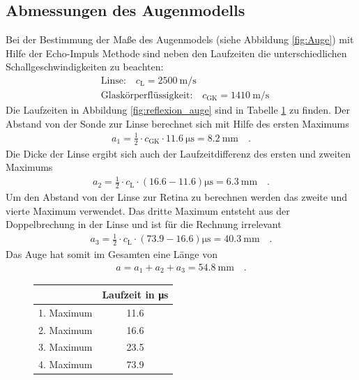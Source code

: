   \subsection{Abmessungen des Augenmodells}
Bei der Bestimmung der Maße des Augenmodels (siehe Abbildung \ref{fig:Auge}) mit Hilfe der Echo-Impuls Methode sind neben den Laufzeiten die unterschiedlichen Schallgeschwindigkeiten zu beachten:
\begin{align}
	& \text{Linse:} \quad c_\text{L} = \SI{2500}{\meter\per\second} \\
	& \text{Glaskörperflüssigkeit:} \quad c_\text{GK} = \SI{1410}{\meter\per\second} 
\end{align}
Die Laufzeiten in Abbildung \ref{fig:reflexion_auge} sind in Tabelle \ref{tab:laufzeiten_auge} zu finden.
Der Abstand von der Sonde zur Linse berechnet sich mit Hilfe des ersten Maximums
\begin{align}
	a_1 = \frac{1}{2}\cdot  c_\text{GK} \cdot \SI{11.6}{\micro\second} =
	\SI{8.2}{\milli\meter}  \quad .
\end{align}
Die Dicke der Linse ergibt sich auch der Laufzeitdifferenz des ersten und zweiten Maximums
\begin{align}
	a_2 = \frac{1}{2}\cdot  c_\text{L} \cdot (16.6-11.6)\si{\micro\second} =
	\SI{6.3}{\milli\meter}  \quad .
\end{align}
Um den Abstand von der Linse zur Retina zu berechnen werden das zweite und vierte Maximum verwendet. Das dritte Maximum entsteht aus der Doppelbrechung in der Linse und ist für die Rechnung irrelevant
\begin{align}
	a_3 = \frac{1}{2}\cdot  c_\text{L} \cdot (73.9-16.6)\si{\micro\second} =
	\SI{40.3}{\milli\meter}  \quad .
\end{align}
Das Auge hat somit im Gesamten eine Länge von 
\begin{align}
	a = a_1 + a_2 + a_3 = \SI{54.8}{\milli\meter} \quad .
\end{align}


	


   \begin{figure}[h!]
   	\centering
   	\begin{tabular}{c|c}
   		& Laufzeit in \si{\micro\second}\\
   		\hline
   		1. Maximum & 11.6 \\
   		2. Maximum & 16.6 \\
   		3. Maximum & 23.5 \\
   		4. Maximum & 73.9
   	\end{tabular}
   	\label{tab:laufzeiten_auge}
   \end{figure}
  
